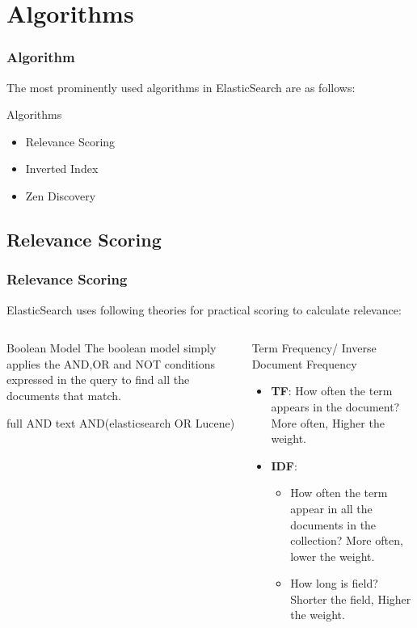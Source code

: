 \documentclass[xcolor=dvipsnames]{beamer}
\begin{document}
\section{Algorithms}
\begin{frame}
\frametitle{Algorithm}
The most prominently used algorithms in ElasticSearch are as follows:
\begin{alertblock}{Algorithms}
\begin{itemize}
\item Relevance Scoring
\item Inverted Index
\item Zen Discovery
\end{itemize}
\end{alertblock}
\end{frame}
\subsection{Relevance Scoring}
\begin{frame}[fragile]
\frametitle{Relevance Scoring}
ElasticSearch uses following theories for practical scoring to calculate relevance: 
\begin{columns}[c]
\begin{exampleblock}{\small{Boolean Model}}
The boolean model simply applies the AND,OR and NOT conditions expressed in the query to find all the documents that match.\\
\begin{verbnobox}[\tiny]
full AND text AND(elasticsearch OR Lucene)
\end{verbnobox}
\end{exampleblock}

\begin{exampleblock}{\small{Term Frequency/ Inverse Document Frequency}}
\scriptsize{
\begin{itemize}
\item \textbf{TF}: How often the term appears in the document? More often, Higher the weight.
\item \textbf{IDF}:{\begin{itemize}
\item \scriptsize{How often the term appear in all the documents in the collection? More often, lower the weight.}
\item \scriptsize{How long is field? Shorter the field, Higher the weight.} 
\end{itemize}}
\end{itemize}}

\end{exampleblock}
\end{columns}
\end{frame}
\end{document}
